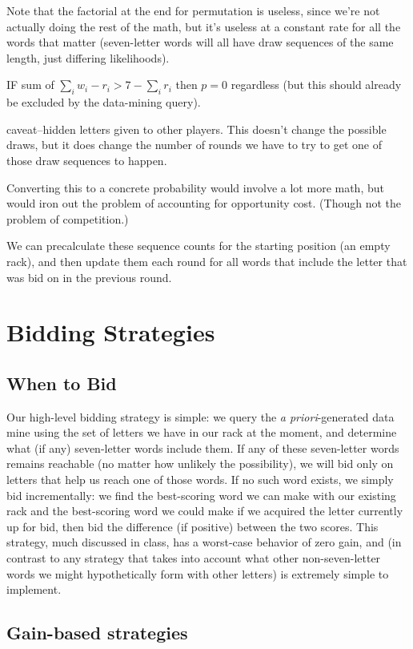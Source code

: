\documentclass[11pt]{article}
\begin{document}
Note that the factorial at the end for permutation is useless, since we're not actually doing the rest of the math, but it's useless at a constant rate for all the words that matter (seven-letter words will all have draw sequences of the same length, just differing likelihoods).

IF sum of $ \sum_{i}w_{i} - r_{i} > 7 - \sum_{i} r_{i}$ then $p = 0$ regardless (but this should already be excluded by the data-mining query).

caveat--hidden letters given to other players.  This doesn't change the possible draws, but it does change the number of rounds we have to try to get one of those draw sequences to happen.

Converting this to a concrete probability would involve a lot more math, but would iron out the problem of accounting for opportunity cost.  (Though not the problem of competition.)

We can precalculate these sequence counts for the starting position (an empty rack), and then update them each round for all words that include the letter that was bid on in the previous round.

\section{Bidding Strategies}

\subsection{When to Bid}

Our high-level bidding strategy is simple: we query the {\it a priori}-generated data mine using the set of letters we have in our rack at the moment, and determine what (if any) seven-letter words include them.  If any of these seven-letter words remains reachable (no matter how unlikely the possibility), we will bid only on letters that help us reach one of those words.
If no such word exists, we simply bid incrementally: we find the best-scoring word we can make with our existing rack and the best-scoring word we could make if we acquired the letter currently up for bid, then bid the difference (if positive) between the two scores.  This strategy, much discussed in class, has a worst-case behavior of zero gain, and (in contrast to any strategy that takes into account what other non-seven-letter words we might hypothetically form with other letters) is extremely simple to implement.

\subsection{Gain-based strategies}
\end{document}
